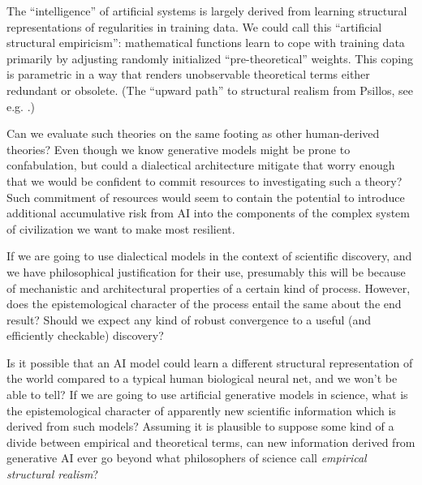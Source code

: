 The ``intelligence'' of artificial systems is largely derived from learning structural representations of regularities in training data. We could call this ``artificial structural empiricism'': mathematical functions learn to cope with training data primarily by adjusting randomly initialized ``pre-theoretical'' weights.  This coping is parametric in a way that renders unobservable theoretical terms either redundant or obsolete.  (The ``upward path'' to structural realism from Psillos, see e.g. \citep[\S 3]{sep-structural-realism}.)

Can we evaluate such theories on the same footing as other human-derived theories?  Even though we know generative models might be prone to confabulation, but could a dialectical architecture mitigate that worry enough that we would be confident to commit resources to investigating such a theory?  Such commitment of resources would seem to contain the potential to introduce additional accumulative risk from AI into the components of the complex system of civilization we want to make most resilient.




If we are going to use dialectical models in the context of scientific discovery, and we have philosophical justification for their use, presumably this will be because of mechanistic and architectural properties of a certain kind of process.  However, does the epistemological character of the process entail the same about the end result?  Should we expect any kind of robust convergence to a useful (and efficiently checkable) discovery?  








Is it possible that an AI model could learn a different structural representation of the world compared to a typical human biological neural net, and we won’t be able to tell?  If we are going to use artificial generative models in science, what is the epistemological character of apparently new scientific information which is derived from such models?  Assuming it is plausible to suppose some kind of a divide between empirical and theoretical terms, can new information derived from generative AI ever go beyond what philosophers of science call \emph{empirical structural realism}?

